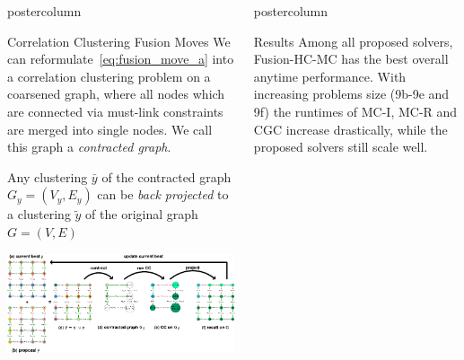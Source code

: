\documentclass[final,hyperref={pdfpagelabels=false}]{beamer}
\newlength{\columnheight}
\begin{document}
\begin{frame}
\begin{columns}
\begin{column}{.49\textwidth}
\begin{beamercolorbox}[center,wd=\textwidth]{postercolumn}
\begin{minipage}[T]{.95\textwidth}
{\begin{block}{Correlation Clustering Fusion Moves}
              We can reformulate~\ref{eq:fusion_move_a}
              into a correlation clustering problem on a coarsened graph, where all nodes which are connected
              via must-link constraints are merged into single nodes. We call this graph a \emph{contracted graph}.

              Any clustering $\bar{y}$ of the contracted graph $G_y=(V_y,E_y)$ can be \emph{back projected} to a clustering $\tilde{y}$ of the original graph $G=(V,E)$

              \vfill
              \vspace{2cm}
              \centering
              \includegraphics[width=1.0\linewidth]{si-crop.pdf}


            \end{block}
            \vfill

          }
        \end{minipage}
      \end{beamercolorbox}
    \end{column}

    \begin{column}{.49\textwidth}
      \begin{beamercolorbox}[center,wd=\textwidth]{postercolumn}
        \begin{minipage}[T]{.95\textwidth} %
          \parbox[t][\columnheight]{\textwidth}{ %
            
            \begin{block}{Results}
            Among all proposed solvers, Fusion-HC-MC has the best overall anytime performance. With increasing problems
            size (9b-9e and 9f) the runtimes of MC-I, MC-R and CGC increase drastically, while the proposed solvers still scale well.



\end{block}}
\end{minipage}
\end{beamercolorbox}
\end{column}
\end{columns}
\end{frame}
\end{document}
